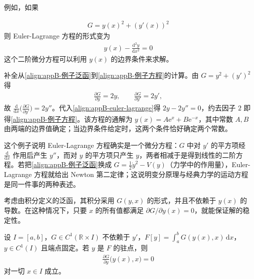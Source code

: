 \documentclass[../main.tex]{subfiles}
\begin{document}
例如，如果
\begin{example}\label{example:appB-积分型泛函例子}
\begin{align}
  G=y(x)^{2}+(y'(x))^{2}
  \label{align:appB-例子泛函}
\end{align}
则 Euler-Lagrange 方程的形式变为
\begin{align}
  y(x)-\frac{\mathrm{d}^{2}y}{\mathrm{d}x^{2}}=0
  \label{align:appB-例子方程}
\end{align}
这个二阶微分方程可以利用 $y(x)$ 的边界条件来求解。
\end{example}

\begin{solution}
补全从\eqref{align:appB-例子泛函}到\eqref{align:appB-例子方程}的计算。由 $G=y^{2}+(y')^{2}$ 得
\begin{align*}
 \frac{\partial G}{\partial y}=2y,\qquad \frac{\partial G}{\partial y'}=2y',
\end{align*}
故 $\frac{\mathrm{d}}{\mathrm{d}x}\bigl(\frac{\partial G}{\partial y'}\bigr)=2y''$。代入\eqref{align:appB-euler-lagrange}得 $2y-2y''=0$，约去因子 $2$ 即得\eqref{align:appB-例子方程}。该方程的通解为 $y(x)=A\mathrm{e}^{x}+B\mathrm{e}^{-x}$，其中常数 $A,B$ 由两端的边界值确定；当边界条件给定时，这两个条件恰好确定两个常数。
\end{solution}

\begin{remark}
这个例子说明 Euler-Lagrange 方程确实是一个微分方程：$G$ 中对 $y'$ 的平方项经 $\frac{\mathrm{d}}{\mathrm{d}x}$ 作用后产生 $y''$，而对 $y$ 的平方项只产生 $y$，两者相减于是得到线性的二阶方程。若把\eqref{align:appB-例子泛函}换成 $G=\frac{1}{2}\dot{y}^{2}-V(y)$（力学中的作用量），Euler-Lagrange 方程就给出 Newton 第二定律；这说明变分原理与经典力学的运动方程是同一件事的两种表述。
\end{remark}

考虑由积分定义的泛函，其积分采用 $G(y,x)$ 的形式，并且不依赖于 $y(x)$ 的导数。在这种情况下，只要 $x$ 的所有值都满足 $\partial G/\partial y(x)=0$，就能保证解的稳定性。

\begin{proposition}[不含导数的泛函的驻点条件]\label{proposition:appB-不含导数}
设 $I=[a,b]$，$G\in C^{1}(\mathbb{R}\times I)$ 不依赖于 $y'$，$F[y]=\int_{a}^{b}G(y(x),x)\,\mathrm{d}x$，$y\in C^{1}(I)$ 且端点固定。若 $y$ 是 $F$ 的驻点，则
\begin{align*}
  \frac{\partial G}{\partial y}\bigl(y(x),x\bigr)=0
\end{align*}
对一切 $x\in I$ 成立。
\end{proposition}
\end{document}

